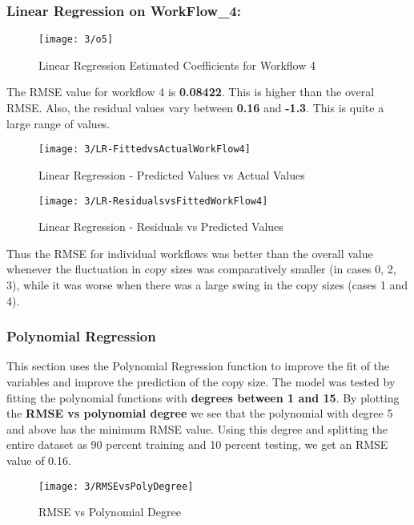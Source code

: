 \documentclass[letterpaper,twocolumn,10pt]{article}
\begin{document}
\subsubsection{Linear Regression on WorkFlow\_4:}
\begin{figure}[H]
  \texttt{[image: 3/o5]}
  \caption{Linear Regression Estimated Coefficients for Workflow 4}
  \label{fig:o5}
\end{figure}
The RMSE value for workflow 4 is  \textbf{0.08422}. This is higher than the overal RMSE. Also, the residual values vary between \textbf{0.16} and \textbf{-1.3}. This is quite a large range of values. 
\begin{figure}[H]
  \texttt{[image: 3/LR-FittedvsActualWorkFlow4]}
  \caption{Linear Regression - Predicted Values vs Actual Values}
  \label{fig:WF4FittedActual}
\end{figure}
\begin{figure}[H]
  \texttt{[image: 3/LR-ResidualsvsFittedWorkFlow4]}
  \caption{Linear Regression - Residuals vs Predicted Values}
  \label{fig:WF4ResidActual}
\end{figure}

Thus the RMSE for individual workflows was better than the overall value whenever the fluctuation in copy sizes was comparatively smaller (in cases 0, 2, 3), while it was worse when there was a large swing in the copy sizes (cases 1 and 4).

\subsubsection{Polynomial Regression}
This section uses the Polynomial Regression function to improve the fit of the variables and improve the prediction of the copy size. The model was tested by fitting the polynomial functions with \textbf{degrees between 1 and 15}. By plotting the \textbf{ RMSE vs polynomial degree} we see that the polynomial with degree 5 and above has the minimum RMSE value. Using this degree and splitting the entire dataset as 90 percent training and 10 percent testing, we get an RMSE value of 0.16.
\begin{figure}[H]
  \texttt{[image: 3/RMSEvsPolyDegree]}
  \caption{RMSE vs Polynomial Degree }
  \label{fig:RMSEPoly}
\end{figure}
\end{document}

